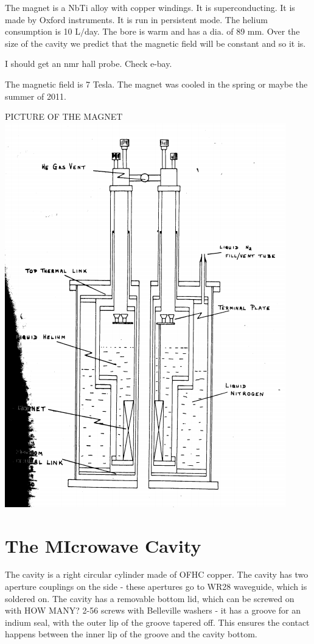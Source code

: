 \documentclass[11pt]{article}
\begin{document}
The magnet is a NbTi alloy with copper windings. It is superconducting. It is made by Oxford instruments. It is run in persistent mode. The helium consumption is 10 L$/$day. The bore is warm and has a dia. of 89 mm.
Over the size of the cavity we predict that the magnetic field will be constant and so it is.

I should get an nmr hall probe. Check e-bay.

The magnetic field is 7 Tesla. The magnet was cooled in the spring or maybe the summer of 2011. 

PICTURE OF THE MAGNET
\includegraphics[width=\textwidth]{nmrmagnet}

\section{The MIcrowave Cavity}

The cavity is a right circular cylinder made of OFHC copper. The cavity has two aperture couplings on the side - these apertures go to WR28 waveguide, which is soldered on. The cavity has a removable bottom lid, which can be screwed on with HOW MANY? 2-56 screws with Belleville washers - it has a groove for an indium seal, with the outer lip of the groove tapered off. This ensures the contact happens between the inner lip of the groove and the cavity bottom.
\end{document}
